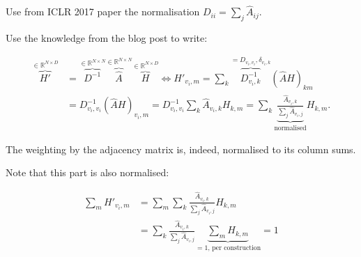 \documentclass[]{article}
\begin{document}
Use from ICLR 2017 paper the normalisation $D_{ii} = \sum_j \hat{A}_{ij}$.

Use the knowledge from the blog post to write:

\begin{equation}
	\begin{split}
		\overbrace{H'}^{\in \mathbb{R}^{N\times D}} 
			& = \overbrace{D^{-1}}^{\in\mathbb{R}^{N\times N}} \overbrace{\hat{A}}^{\in \mathbb{R}^{N\times N}} \overbrace{H}^{\in\mathbb{R}^{N\times D}}
			\Leftrightarrow H'_{v_i, m} = \sum_k \overbrace{D^{-1}_{v_i,k}}^{=D_{v_i,v_i}, \delta_{v_i, k}} (\hat{A} H)_{km} \\
		& = D^{-1}_{v_i, v_i} (\hat{A} H)_{v_i, m} = D^{-1}_{v_i, v_i} \sum_k \hat{A}_{v_i, k} H_{k, m} = \sum_k \underbrace{\frac{\hat{A}_{v_i, k}}{\sum_j \hat{A}_{v_i, j}}}_{\text{normalised}} H_{k, m}.
	\end{split}
\end{equation}

The weighting by the adjacency matrix is, indeed, normalised to its column sums.

Note that this part is also normalised:

\begin{equation}
\begin{split}
	\sum_m H'_{v_i, m} & = \sum_m \sum_k \frac{\hat{A}_{v_i, k}}{\sum_j \hat{A}_{v_i, j}} H_{k, m} \\
	& = \sum_k \frac{\hat{A}_{v_i, k}}{\sum_j \hat{A}_{v_i, j}} \underbrace{\sum_m H_{k,m}}_{=1\text{, per construction}} = 1
\end{split}
\end{equation}
\end{document}
